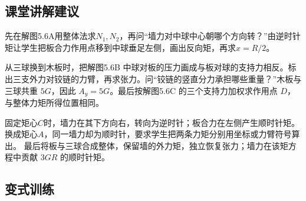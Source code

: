 \documentclass[UTF8,fontset=fandol,a4paper,11pt]{ctexart}
\begin{document}


\subsection*{课堂讲解建议}

先在解图5.6A用整体法求$N_1,N_2$，再问“墙力对中球中心朝哪个方向转？”由逆时针矩让学生把板合力作用点移到中球垂足左侧，画出反向矩，再求$x=R/2$。

从三球换到木板时，把解图5.6B 中球对板的压力画成与板对球的支持力相反。标出三支外力对铰链的力臂，再求张力。问“铰链的竖直分力承担哪些重量？”木板与三球共重 $5G$，因此 $A_y=5G$。最后按解图5.6C 的三个支持力加权求作用点 $D$，与整体力矩所得位置相同。

固定矩心$C$时，墙力在其下方向右，转向为逆时针；板合力在左侧产生顺时针矩。
换成矩心$A$，同一墙力却为顺时针，要求学生把两条力矩分别用坐标或力臂符号算出。
最后将板与三球合成整体，保留墙的外力矩，独立恢复张力；墙力在该矩方程中贡献 $3GR$ 的顺时针矩。



\subsection*{变式训练}
\end{document}
